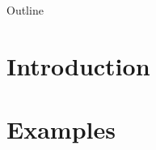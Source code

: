 \documentclass{presets}
\begin{document}
\begin{frame}
  \titlepage
\end{frame}

\begin{frame}{Outline}
	\tableofcontents
\end{frame}

\section{Introduction}


\section{Examples}




\end{document}
